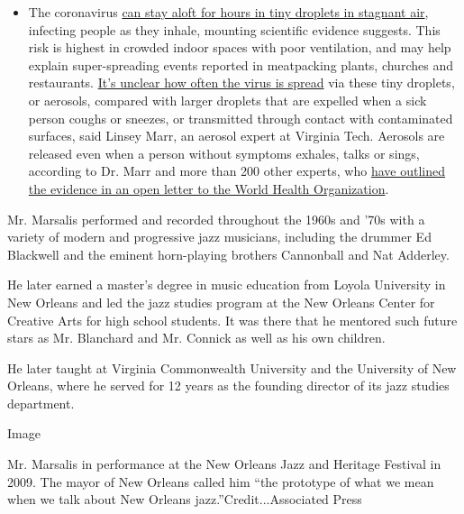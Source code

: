 \begin{itemize}
  \begin{itemize}
  \tightlist
  \item
    The coronavirus
    \href{https://www.nytimes3xbfgragh.onion/2020/07/04/health/239-experts-with-one-big-claim-the-coronavirus-is-airborne.html?action=click\&pgtype=Article\&state=default\&region=MAIN_CONTENT_3\&context=storylines_faq}{can
    stay aloft for hours in tiny droplets in stagnant air}, infecting
    people as they inhale, mounting scientific evidence suggests. This
    risk is highest in crowded indoor spaces with poor ventilation, and
    may help explain super-spreading events reported in meatpacking
    plants, churches and restaurants.
    \href{https://www.nytimes3xbfgragh.onion/2020/07/06/health/coronavirus-airborne-aerosols.html?action=click\&pgtype=Article\&state=default\&region=MAIN_CONTENT_3\&context=storylines_faq}{It's
    unclear how often the virus is spread} via these tiny droplets, or
    aerosols, compared with larger droplets that are expelled when a
    sick person coughs or sneezes, or transmitted through contact with
    contaminated surfaces, said Linsey Marr, an aerosol expert at
    Virginia Tech. Aerosols are released even when a person without
    symptoms exhales, talks or sings, according to Dr. Marr and more
    than 200 other experts, who
    \href{https://academic.oup.com/cid/article/doi/10.1093/cid/ciaa939/5867798}{have
    outlined the evidence in an open letter to the World Health
    Organization}.
  \end{itemize}
\end{itemize}

Mr. Marsalis performed and recorded throughout the 1960s and '70s with a
variety of modern and progressive jazz musicians, including the drummer
Ed Blackwell and the eminent horn-playing brothers Cannonball and Nat
Adderley.

He later earned a master's degree in music education from Loyola
University in New Orleans and led the jazz studies program at the New
Orleans Center for Creative Arts for high school students. It was there
that he mentored such future stars as Mr. Blanchard and Mr. Connick as
well as his own children.

He later taught at Virginia Commonwealth University and the University
of New Orleans, where he served for 12 years as the founding director of
its jazz studies department.

Image

Mr. Marsalis in performance at the New Orleans Jazz and Heritage
Festival in 2009. The mayor of New Orleans called him ``the prototype of
what we mean when we talk about New Orleans jazz.''Credit...Associated
Press

